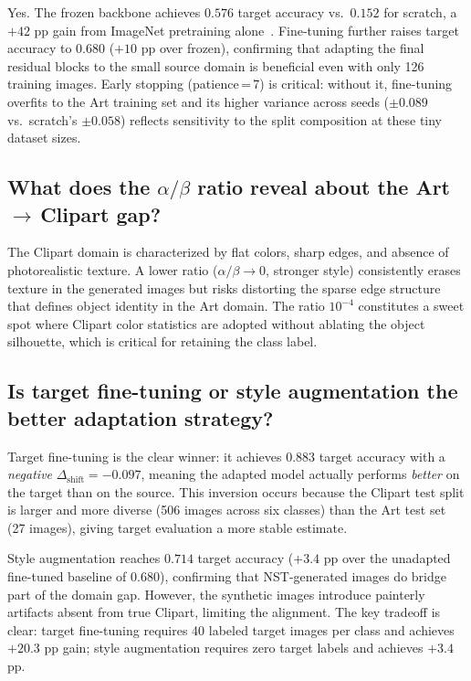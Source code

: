 \documentclass[conference]{IEEEtran}
\begin{document}
Yes.
The frozen backbone achieves $0.576$ target accuracy vs.\ $0.152$ for scratch,
a $+42$ pp gain from ImageNet pretraining alone~\cite{kornblith2019transfer}.
Fine-tuning further raises target accuracy to $0.680$ ($+10$ pp over frozen),
confirming that adapting the final residual blocks to the small source domain
is beneficial even with only 126 training images.
Early stopping (patience\,=\,7) is critical: without it, fine-tuning overfits
to the Art training set and its higher variance across seeds ($\pm0.089$
vs.\ scratch's $\pm0.058$) reflects sensitivity to the split composition
at these tiny dataset sizes.

\subsection{What does the $\alpha/\beta$ ratio reveal about the Art\,$\to$\,Clipart gap?}

The Clipart domain is characterized by flat colors, sharp edges, and absence of
photorealistic texture.
A lower ratio ($\alpha/\beta \to 0$, stronger style) consistently erases texture in the
generated images but risks distorting the sparse edge structure that defines object identity
in the Art domain.
The ratio $10^{-4}$ constitutes a sweet spot where Clipart color statistics are adopted
without ablating the object silhouette, which is critical for retaining the class label.

\subsection{Is target fine-tuning or style augmentation the better adaptation strategy?}

Target fine-tuning is the clear winner: it achieves $0.883$ target accuracy with a
\emph{negative} $\Delta_{\text{shift}} = -0.097$, meaning the adapted model
actually performs \emph{better} on the target than on the source.
This inversion occurs because the Clipart test split is larger and more diverse
(506 images across six classes) than the Art test set (27 images), giving target
evaluation a more stable estimate.

Style augmentation reaches $0.714$ target accuracy ($+3.4$ pp over the unadapted
fine-tuned baseline of $0.680$), confirming that NST-generated images do bridge
part of the domain gap.
However, the synthetic images introduce painterly artifacts absent from true Clipart,
limiting the alignment.
The key tradeoff is clear: target fine-tuning requires 40 labeled target images per
class and achieves $+20.3$ pp gain; style augmentation requires zero target labels
and achieves $+3.4$ pp.
\end{document}
